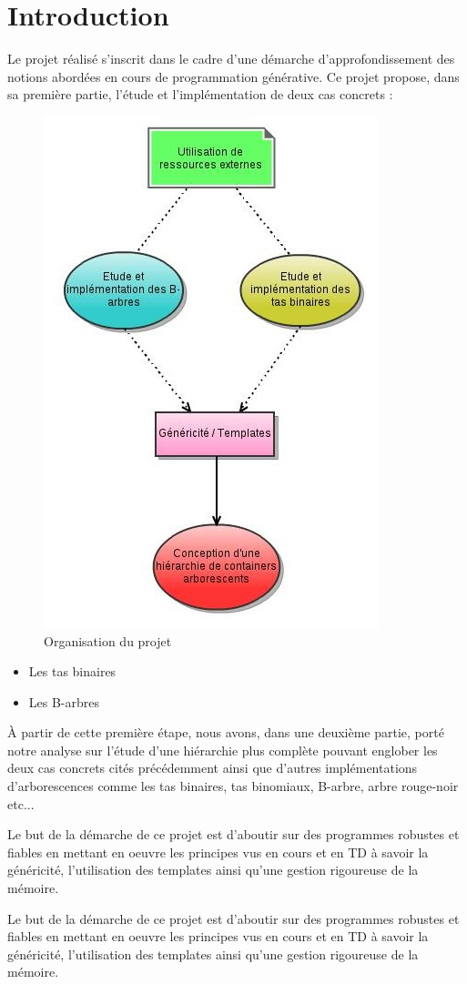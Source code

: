 \chapter{Introduction}
Le projet réalisé s'inscrit dans le cadre d’une démarche d’approfondissement des notions abordées en cours de programmation générative. Ce projet propose, dans sa première partie, l'étude et l’implémentation de deux cas concrets :
\begin{figure}[h]
	\centering
	\includegraphics[scale=0.5]{presentation}
	\caption{Organisation du projet}
	\label{fig:organisation}
\end{figure}
\begin{itemize}
   \item Les tas binaires
   \item Les B-arbres
\end{itemize}
À partir de cette première étape, nous avons, dans une deuxième partie, porté notre analyse sur l'étude d'une hiérarchie plus complète pouvant englober les deux cas concrets cités précédemment ainsi que d'autres implémentations d'arborescences comme les tas binaires, tas binomiaux, B-arbre, arbre rouge-noir etc...

Le but de la démarche de ce projet est d'aboutir sur des programmes robustes et fiables en mettant en oeuvre les principes vus en cours et en TD à savoir la généricité, l'utilisation des templates ainsi qu'une gestion rigoureuse de la mémoire.

Le but de la démarche de ce projet est d'aboutir sur des programmes robustes et fiables en mettant en oeuvre les principes vus en cours et en TD à savoir la généricité, l'utilisation des templates ainsi qu'une gestion rigoureuse de la mémoire.
